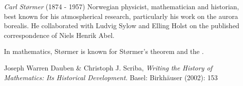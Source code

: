 \documentclass[12pt]{article}
\begin{document}
\emph{Carl St{\o}rmer} (1874 - 1957) Norwegian physicist, mathematician and historian, best known for his atmospherical research, particularly his work on the aurora borealis. He collaborated with Ludvig Sylow and Elling Holst on the published correspondence of Niels Henrik Abel.

In mathematics, St{\o}rmer is known for St{\o}rmer's theorem and the .

\begin{thebibliography}{1}
 Joseph Warren Dauben \& Christoph J. Scriba, {\it Writing the History of Mathematics: Its Historical Development}. Basel: Birkh\"auser (2002): 153
\end{thebibliography}
\end{document}
